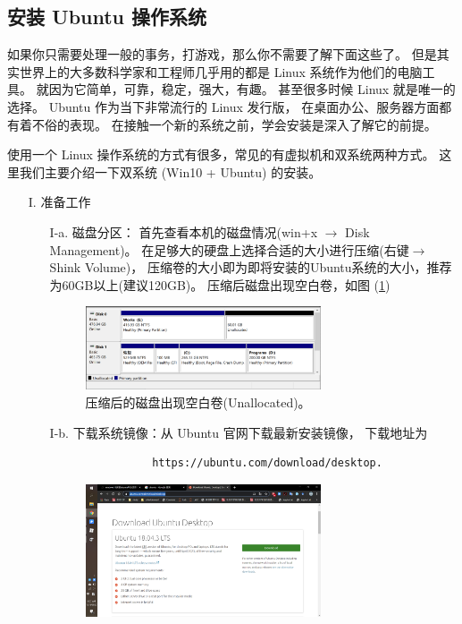 \subsection{安装 Ubuntu 操作系统}

如果你只需要处理一般的事务，打游戏，那么你不需要了解下面这些了。
但是其实世界上的大多数科学家和工程师几乎用的都是 Linux 系统作为他们的电脑工具。
就因为它简单，可靠，稳定，强大，有趣。
甚至很多时候 Linux 就是唯一的选择。
Ubuntu 作为当下非常流行的 Linux 发行版，
在桌面办公、服务器方面都有着不俗的表现。
在接触一个新的系统之前，学会安装是深入了解它的前提。

使用一个 Linux 操作系统的方式有很多，常见的有虚拟机和双系统两种方式。
这里我们主要介绍一下双系统 (Win10 + Ubuntu) 的安装。

\begin{itemize}
	\item [I.] 准备工作
		\begin{itemize}
			\item [I-a.] 磁盘分区：
			    首先查看本机的磁盘情况(win+x $\to$ Disk Management)。
				在足够大的硬盘上选择合适的大小进行压缩(右键$\to$Shink Volume)，
				压缩卷的大小即为即将安装的Ubuntu系统的大小，推荐为60GB以上(建议120GB)。
				压缩后磁盘出现空白卷，如图 (\ref{fig:shrinkVol})
				\begin{figure}[htbp]
					\centering
					\includegraphics[width=0.7\textwidth]{png/shrinkVol}
					\caption{压缩后的磁盘出现空白卷(Unallocated)。}
					\label{fig:shrinkVol}
				\end{figure}
			\item [I-b.] 下载系统镜像：从 Ubuntu 官网下载最新安装镜像，
				下载地址为
				\begin{verbatim}
				https://ubuntu.com/download/desktop.
				\end{verbatim}
				\begin{figure}[htbp]
					\centering
					\includegraphics[width=0.7\textwidth]{png/ubuntuDown}

\end{figure}
\end{itemize}
\end{itemize}
